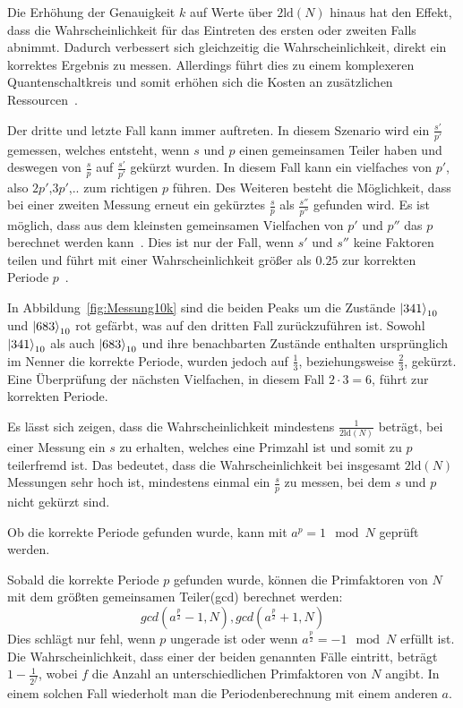Die Erhöhung der Genauigkeit \(k\) auf Werte über \(2\text{ld}(N)\) hinaus hat den Effekt, 
dass die Wahrscheinlichkeit für das Eintreten des ersten oder zweiten Falls abnimmt.
Dadurch verbessert sich gleichzeitig die Wahrscheinlichkeit, direkt ein korrektes Ergebnis zu messen.
Allerdings führt dies zu einem komplexeren Quantenschaltkreis und 
somit erhöhen sich die Kosten an zusätzlichen Ressourcen~\autocite[229]{nielsen_chuang_2010}.

Der dritte und letzte Fall kann immer auftreten.
In diesem Szenario wird ein \(\frac{s'}{p'}\) gemessen, 
welches entsteht, wenn \(s\) und \(p\) einen gemeinsamen Teiler haben und 
deswegen von \(\frac{s}{p}\) auf \(\frac{s'}{p'}\) gekürzt wurden.
In diesem Fall kann ein vielfaches von \(p'\), also \(2p'\),\(3p'\),.. zum richtigen \(p\) führen.
Des Weiteren besteht die Möglichkeit, 
dass bei einer zweiten Messung erneut ein gekürztes \(\frac{s}{p}\) als \(\frac{s''}{p''}\) gefunden wird.
Es ist möglich, dass aus dem kleinsten gemeinsamen Vielfachen von \(p'\) und \(p''\) das \(p\) berechnet werden kann~\cite{Shor_1997}.
Dies ist nur der Fall, wenn \(s'\) und \(s''\) keine Faktoren teilen und 
führt mit einer Wahrscheinlichkeit größer als \(0.25\) zur korrekten Periode \(p\)~\autocite[231]{nielsen_chuang_2010}.

In Abbildung~\ref{fig:Messung10k} sind die beiden Peaks um die Zustände \(\ket{341}_{10}\) und \(\ket{683}_{10}\) rot gefärbt, 
was auf den dritten Fall zurückzuführen ist.
Sowohl \(\ket{341}_{10}\) als auch \(\ket{683}_{10}\) und ihre benachbarten Zustände 
enthalten ursprünglich im Nenner die korrekte Periode, 
wurden jedoch  auf \(\frac{1}{3}\), beziehungsweise \(\frac{2}{3}\), gekürzt. 
Eine Überprüfung der nächsten Vielfachen, in diesem Fall \(2 \cdot 3 = 6 \), führt zur korrekten Periode.

Es lässt sich zeigen, dass die Wahrscheinlichkeit mindestens \(\frac{1}{2\text{ld}(N)}\) beträgt, 
bei einer Messung ein \(s\) zu erhalten, welches eine Primzahl ist und somit zu \(p\) teilerfremd ist.
Das bedeutet, dass die Wahrscheinlichkeit bei insgesamt \(2\text{ld}(N)\) Messungen sehr hoch ist, 
mindestens einmal ein \(\frac{s}{p}\) zu messen, 
bei dem \(s\) und \(p\) nicht gekürzt sind.~\cite[231]{nielsen_chuang_2010}

Ob die korrekte Periode gefunden wurde, kann mit \(a^p = 1 \mod N\) geprüft werden.

Sobald die korrekte Periode \(p\) gefunden wurde, 
können die Primfaktoren von \(N\) mit dem größten gemeinsamen Teiler(gcd) berechnet werden:
\[gcd(a^{\frac{p}{2}}-1, N), gcd(a^{\frac{p}{2}}+1, N)\]
Dies schlägt nur fehl, 
wenn \(p\) ungerade ist
oder wenn \(a^{\frac{p}{2}} = -1 \mod N\) erfüllt ist.
Die Wahrscheinlichkeit, dass einer der beiden genannten Fälle eintritt, beträgt \(1-\frac{1}{2^f}\), 
wobei \(f\) die Anzahl an unterschiedlichen Primfaktoren von \(N\) angibt.
In einem solchen Fall wiederholt man die Periodenberechnung mit einem anderen \(a\).\cite{Shor_1997}

